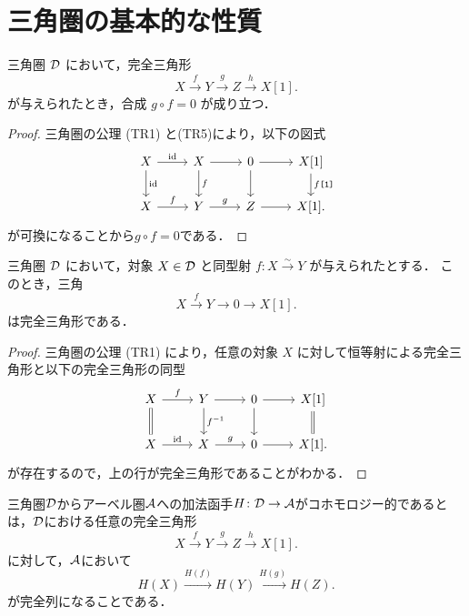 \section{三角圏の基本的な性質}
\begin{prop}\cite[p.245]{KS06}\label{gf=0}
三角圏 ${\mathcal D}$ において，完全三角形
\[
X \xrightarrow{f} Y \xrightarrow{g} Z \xrightarrow{h} X[1].
\]
が与えられたとき，合成 $g \circ f = 0$ が成り立つ．
\end{prop}

\begin{proof}
三角圏の公理 (TR1) と(TR5)により，以下の図式
		\[
\begin{tikzcd}
	X\ar[r,"\id"]\ar[d,"\id"]&X \ar[r]\ar[d,"f"]& 0\ar[r]\ar[d]& X[1]\ar[d,"f\texttt{[1]}"]\\
	X\ar[r,"f"]&Y \ar[r,"g"]& Z\ar[r]& X[1].
\end{tikzcd}
	\]
	が可換になることから$g\circ f = 0$である．
\end{proof}

\begin{prop}\cite[p.245]{KS06}
三角圏 ${\mathcal D}$ において，対象 $X \in {\mathcal D}$ と同型射 $f \colon X \xrightarrow{\sim} Y$ が与えられたとする．
このとき，三角
\[
X \xrightarrow{f} Y \to 0 \to X[1].
\]
は完全三角形である．
\end{prop}

\begin{proof}
三角圏の公理 \textnormal{(TR1)} により，任意の対象 $X$ に対して恒等射による完全三角形と以下の完全三角形の同型
		\[
\begin{tikzcd}
	X\ar[r,"f"]\ar[d,equal]&Y \ar[r]\ar[d,"f\inv"]& 0\ar[r]\ar[d]& X[1]\ar[d,equal]\\
	X\ar[r,"\id"]&X \ar[r,"g"]& 0\ar[r]& X[1].
\end{tikzcd}
	\]
	が存在するので，上の行が完全三角形であることがわかる．
\end{proof}

\begin{defn}\cite[p.245]{KS06}
	三角圏${\mathcal D}$からアーベル圏${\mathcal A}$への加法函手$H\colon {\mathcal D}\to{\mathcal A}$がコホモロジー的であるとは，${\mathcal D}$における任意の完全三角形
	\[X\xrightarrow{f}Y\xrightarrow{g}Z\xrightarrow{h}X[1].\]
	に対して，${\mathcal A}$において
	\[H(X)\xrightarrow{H(f)}H(Y)\xrightarrow{H(g)}H(Z).\]
	が完全列になることである．
\end{defn}

